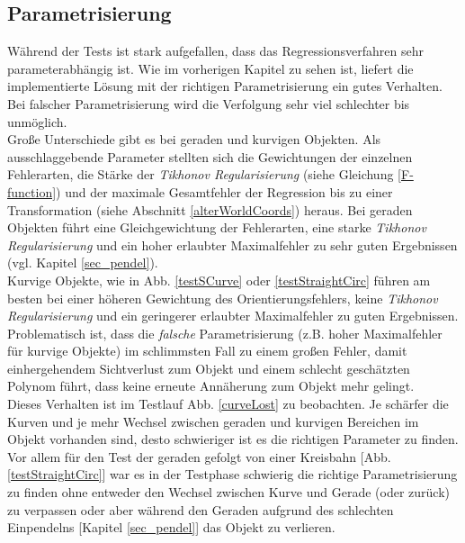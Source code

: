 \subsection{Parametrisierung}
\label{sec_param}
Während der Tests ist stark aufgefallen, dass das Regressionsverfahren sehr parameterabhängig ist. Wie im vorherigen Kapitel zu sehen ist, liefert die implementierte Lösung mit der richtigen Parametrisierung ein gutes Verhalten. 
Bei falscher Parametrisierung wird die Verfolgung sehr viel schlechter bis unmöglich.\\
Große Unterschiede gibt es bei geraden und kurvigen Objekten. Als ausschlaggebende Parameter stellten sich die Gewichtungen der einzelnen Fehlerarten, die Stärke der \textit{Tikhonov Regularisierung} (siehe Gleichung \ref{F-function}) und der maximale Gesamtfehler der Regression bis zu einer Transformation (siehe Abschnitt \ref{alterWorldCoords}) heraus.
Bei geraden Objekten führt eine Gleichgewichtung der Fehlerarten, eine starke \textit{Tikhonov Regularisierung} und ein hoher erlaubter Maximalfehler zu sehr guten Ergebnissen (vgl. Kapitel \ref{sec_pendel}).\\
Kurvige Objekte, wie in Abb. \ref{testSCurve} oder \ref{testStraightCirc} führen am besten bei einer höheren Gewichtung des Orientierungsfehlers, keine \textit{Tikhonov Regularisierung} und ein geringerer erlaubter Maximalfehler zu guten Ergebnissen.
Problematisch ist, dass die \textit{falsche} Parametrisierung (z.B. hoher Maximalfehler für kurvige Objekte) im schlimmsten Fall zu einem großen Fehler, damit einhergehendem Sichtverlust zum Objekt und einem schlecht geschätzten Polynom führt, dass keine erneute Annäherung zum Objekt mehr gelingt. \\
Dieses Verhalten ist im Testlauf Abb. \ref{curveLost} zu beobachten. Je schärfer die Kurven und je mehr Wechsel zwischen geraden und kurvigen Bereichen im Objekt vorhanden sind, desto schwieriger ist es die richtigen Parameter zu finden. Vor allem für den Test der geraden gefolgt von einer Kreisbahn [Abb. \ref{testStraightCirc}] war es in der Testphase schwierig die richtige Parametrisierung zu finden ohne entweder den Wechsel zwischen Kurve und Gerade (oder zurück) zu verpassen oder aber während den Geraden aufgrund des schlechten Einpendelns [Kapitel \ref{sec_pendel}] das Objekt zu verlieren.

